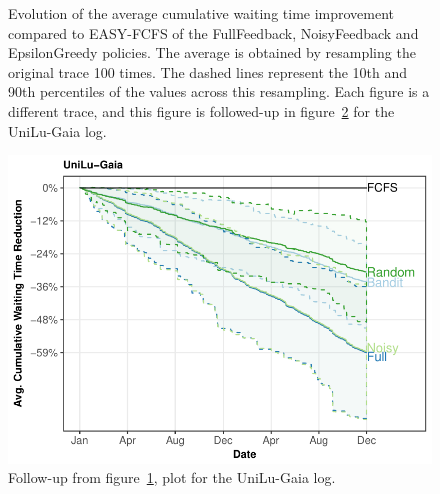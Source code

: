 \documentclass[sigconf]{acmart}
\begin{document}
\begin{figure}[h]
  \caption{Evolution of the average cumulative waiting time improvement
    compared to EASY-FCFS of the FullFeedback, NoisyFeedback and EpsilonGreedy
    policies. The average is obtained by resampling the original trace 100
    times. The dashed lines represent the 10th and 90th percentiles of the
  values across this resampling. Each figure is a different trace, and this
figure is followed-up in figure~\ref{fig:follow} for the UniLu-Gaia log.}

  \label{fig:small}
\end{figure}

\begin{figure}[ht]
  \centering
  \includegraphics[scale=0.6]{figures/UniLu-Ga.pdf}

  \caption{Follow-up from figure~\ref{fig:small}, plot for the UniLu-Gaia log.}

  \label{fig:follow}
\end{figure}
\end{document}
